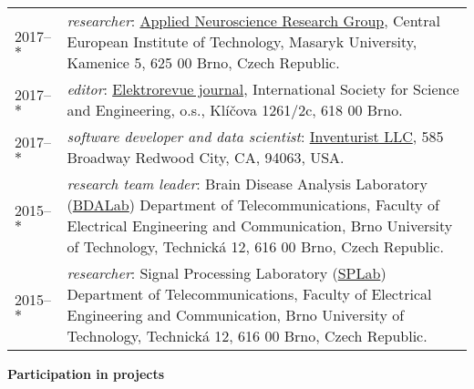 \vspace{1em}

\noindent
\begin{longtable}{@{}p{2.8cm}p{11.5cm}}
 2017--$*$ & \emph{researcher}: \href{https://is.muni.cz/auth/lide/pracoviste?lang=en;zobrazid=14714005}{Applied Neuroscience Research Group}, Central European Institute of Technology, Masaryk University, Kamenice 5, 625 00 Brno, Czech Republic. \\
 2017--$*$ & \emph{editor}: \href{http://www.elektrorevue.cz/}{Elektrorevue journal}, International Society for Science and Engineering, o.s., Kl\'{i}\v{c}ova 1261/2c, 618 00 Brno. \\
 2017--$*$ & \emph{software developer and data scientist}: \href{https://www.inventurist.ai/about/}{Inventurist LLC}, 585 Broadway Redwood City, CA, 94063, USA. \\
 2015--$*$ & \emph{research team leader}: Brain Disease Analysis Laboratory (\href{http://bdalab.utko.feec.vutbr.cz/}{BDALab}) Department of Telecommunications, Faculty of Electrical Engineering and Communication, Brno University of Technology, Technick\'{a} 12, 616 00 Brno, Czech Republic. \\
 2015--$*$ & \emph{researcher}: Signal Processing Laboratory (\href{http://splab.cz/en/}{SPLab}) Department of Telecommunications, Faculty of Electrical Engineering and Communication, Brno University of Technology, Technick\'{a} 12, 616 00 Brno, Czech Republic.
\end{longtable}

\vspace{1em}

\noindent
\textbf{Participation in projects}

\vspace{1em}

